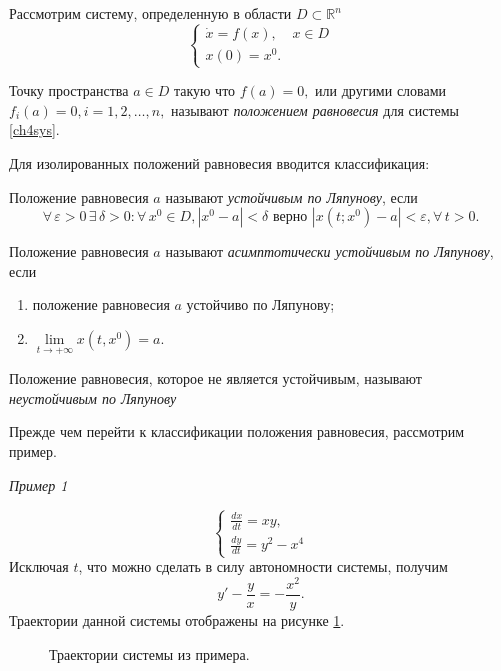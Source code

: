 Рассмотрим систему, определенную в области  $D \subset \ensuremath{\mathbb{R}}^n$
\begin{equation} \label{ch4sys}
\begin{cases}
\dot x = f(x), & x \in D \\
x(0) = x^0.
\end{cases}
\end{equation}
\begin{definition} Точку пространства $a \in D$ такую что $f(a) = 0,$ или другими словами $f_i(a) = 0, i = 1,2, \ldots, n ,$ называют \textit{положением равновесия} для системы \eqref{ch4sys}. \end{definition}
Для изолированных положений равновесия вводится классификация:
\begin{definition}
Положение равновесия $a$ называют \textit{устойчивым по Ляпунову}, если 
$$
\forall \, \varepsilon > 0 \, \exists \, \delta > 0 : \forall \, x^0 \in D, |x^0 - a| < \delta \text{ верно } |x(t; x^0) - a| < \varepsilon, \forall \, t >0.
$$
\end{definition}
\begin{definition}
Положение равновесия $a$ называют \textit{асимптотически устойчивым по Ляпунову}, если
\begin{enumerate}
\item положение равновесия $a$ устойчиво по Ляпунову;
\item $\lim\limits_{t\rightarrow + \infty} x(t, x^0) = a. $
\end{enumerate}
\end{definition}
\begin{definition} 
Положение равновесия, которое не является устойчивым, называют \textit{неустойчивым по Ляпунову}
\end{definition}

Прежде чем перейти к классификации положения равновесия, рассмотрим пример.

\textit{Пример 1}

$$
\begin{cases}
\frac{dx}{dt} = xy, \\
\frac{dy}{dt} = y^2 - x^4
\end{cases}
$$
Исключая $t$, что можно сделать в силу автономности системы, получим $$y' - \frac{y}{x}=-\frac{x^2}{y}.$$Траектории данной системы отображены на рисунке \ref{ch4ex1}.

\begin{figure}[h]
	\caption{Траектории системы из примера.}
	\label{ch4ex1}

\end{figure}


